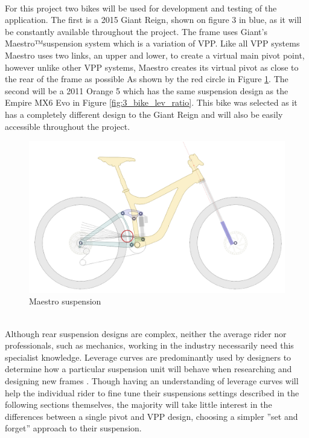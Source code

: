 		\\
		For this project two bikes will be used for development and testing of the application. The first is a 2015 Giant Reign, shown on figure 3 in blue, as it will be constantly available throughout the project. The frame uses Giant’s Maestro™suspension system which is a variation of VPP. Like all VPP systems Maestro uses two links, an upper and lower, to create a virtual main pivot point, however unlike other VPP systems, Maestro creates its virtual pivot as close to the rear of the frame as possible As shown by the red circle in Figure \ref{fig:maestro}. The second will be a 2011 Orange 5 which has the same suspension design as the Empire MX6 Evo in Figure \ref{fig:3_bike_lev_ratio}. This bike was selected as it has a completely different design to the Giant Reign and will also be easily accessible throughout the project. 
		\begin{figure}[h!]
			\centering
			\includegraphics[width=12cm]{../images/reignsch.PNG}
			\caption{Maestro suspension}
			\label{fig:maestro}
		\end{figure}
		\\
		Although rear suspension designs are complex, neither the average rider nor professionals, such as mechanics, working in the industry necessarily need this specialist knowledge. Leverage curves are predominantly used by designers to determine how a particular suspension unit will behave when researching and designing new frames \citep{creek2016curves}. Though having an understanding of leverage curves will help the individual rider to fine tune their suspensions settings described in the following sections themselves, the majority will take little interest in the differences between a single pivot and VPP design, choosing a simpler ”set and forget” approach to their suspension. 
		\\\\
